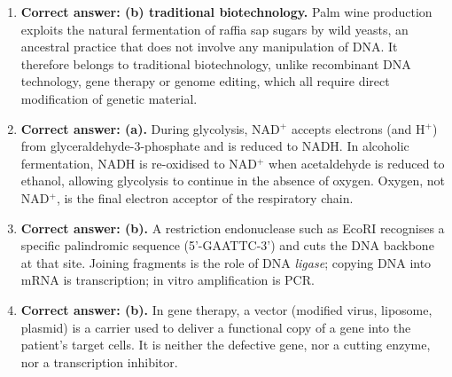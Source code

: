 \documentclass[11pt]{article}
\newcommand{\cle}[1]{{\popxbold\color{popdark}#1}}
\begin{document}
\begin{corrige}
\begin{enumerate}
\item \textbf{Correct answer: (b) traditional biotechnology.} Palm wine production exploits the natural fermentation of raffia sap sugars by wild yeasts, an ancestral practice that does not involve any manipulation of DNA. It therefore belongs to \cle{traditional biotechnology}, unlike recombinant DNA technology, gene therapy or genome editing, which all require direct modification of genetic material.
\item \textbf{Correct answer: (a).} During glycolysis, NAD$^+$ accepts electrons (and H$^+$) from glyceraldehyde-3-phosphate and is reduced to NADH. In alcoholic fermentation, NADH is re-oxidised to NAD$^+$ when acetaldehyde is reduced to ethanol, allowing glycolysis to continue in the absence of oxygen. Oxygen, not NAD$^+$, is the final electron acceptor of the respiratory chain.
\item \textbf{Correct answer: (b).} A restriction endonuclease such as EcoRI recognises a specific palindromic sequence (5'-GAATTC-3') and cuts the DNA backbone at that site. Joining fragments is the role of DNA \emph{ligase}; copying DNA into mRNA is transcription; in vitro amplification is PCR.
\item \textbf{Correct answer: (b).} In gene therapy, a \cle{vector} (modified virus, liposome, plasmid) is a carrier used to deliver a functional copy of a gene into the patient's target cells. It is neither the defective gene, nor a cutting enzyme, nor a transcription inhibitor.
\end{enumerate}
\end{corrige}
\end{document}
